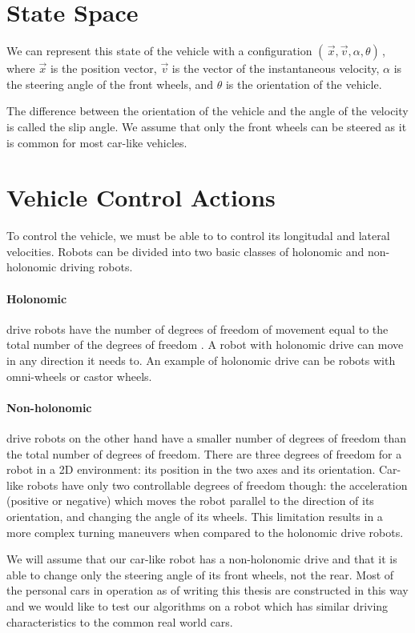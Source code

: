 \section{State Space}

We can represent this state of the vehicle with a configuration $( \, \vec{x}, \vec{v}, \alpha, \theta ) \,$, where $\vec{x}$ is the position vector, $\vec{v}$ is the vector of the instantaneous velocity, $\alpha$ is the steering angle of the front wheels, and $\theta$ is the orientation of the vehicle.

The difference between the orientation of the vehicle and the angle of the velocity is called the slip angle. We assume that only the front wheels can be steered as it is common for most car-like vehicles.

\section{Vehicle Control Actions}

To control the vehicle, we must be able to to control its longitudal and lateral velocities. Robots can be divided into two basic classes of holonomic and non-holonomic driving robots.

\paragraph{Holonomic} drive robots have the number of degrees of freedom of movement equal to the total number of the degrees of freedom \cite{}. A robot with holonomic drive can move in any direction it needs to. An example of holonomic drive can be robots with omni-wheels or castor wheels.

\paragraph{Non-holonomic} drive robots on the other hand have a smaller number of degrees of freedom than the total number of degrees of freedom. There are three degrees of freedom for a robot in a 2D environment: its position in the two axes and its orientation. Car-like robots have only two controllable degrees of freedom though: the acceleration (positive or negative) which moves the robot parallel to the direction of its orientation, and changing the angle of its wheels. This limitation results in a more complex turning maneuvers when compared to the holonomic drive robots.

We will assume that our car-like robot has a non-holonomic drive and that it is able to change only the steering angle of its front wheels, not the rear. Most of the personal cars in operation as of writing this thesis are constructed in this way and we would like to test our algorithms on a robot which has similar driving characteristics to the common real world cars.

